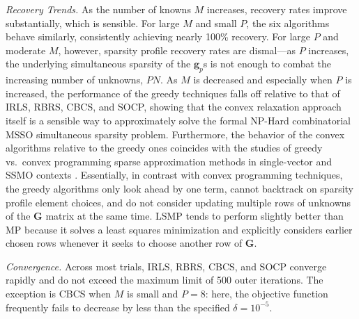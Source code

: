 \documentclass[final]{siamltex}
\newcommand{\la}[1]{\mbox{$\mathbf{#1}$}}  \newcommand{\sst}[1]{\mbox{\scriptsize{#1}}}
\begin{document}
   {\em{Recovery Trends}.} As the number of knowns $M$ increases,
   recovery rates improve substantially, which is sensible.  For large
   $M$ and small $P$, the six algorithms behave similarly,
   consistently achieving nearly 100\% recovery.  For large $P$ and
   moderate $M$, however, sparsity profile recovery rates are
   dismal---as $P$ increases, the underlying simultaneous sparsity of
   the $\la{g}_p$s is not enough to combat the increasing number of
   unknowns, $PN$.  As $M$ is decreased and especially when $P$ is
   increased, the performance of the greedy techniques falls off
   relative to that of IRLS, RBRS, CBCS, and SOCP, showing that the
   convex relaxation approach itself is a sensible way to
   approximately solve the formal NP-Hard combinatorial MSSO
   simultaneous sparsity problem.  Furthermore, the behavior of the
   convex algorithms relative to the greedy ones coincides with the
   studies of greedy vs.~convex programming sparse approximation
   methods in single-vector \cite{Che1998, Cot1999} and SSMO contexts
   \cite{Cot2005}.  Essentially, in contrast with convex programming
   techniques, the greedy algorithms only look ahead by one term,
   cannot backtrack on sparsity profile element choices, and do not
   consider updating multiple rows of unknowns of the $\la{G}$ matrix
   at the same time.  LSMP tends to perform slightly better than MP
   because it solves a least squares minimization and explicitly
   considers earlier chosen rows whenever it seeks to choose another
   row of $\la{G}$.

   {\em{Convergence}.} Across most trials, IRLS, RBRS, CBCS, and SOCP
   converge rapidly and do not exceed the maximum limit of 500 outer
   iterations.  The exception is CBCS when $M$ is small and $P = 8$:
   here, the objective function frequently fails to decrease by less
   than the specified $\delta = 10^{-5}$.
\end{document}
